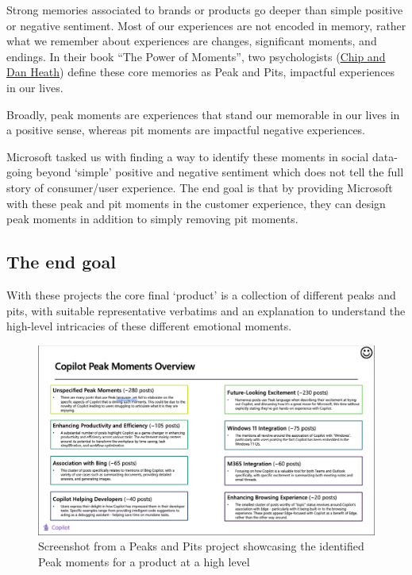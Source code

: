\documentclass[
  letterpaper,
  DIV=11,
  numbers=noendperiod]{scrreprt}
\begin{document}
Strong memories associated to brands or products go deeper than simple
positive or negative sentiment. Most of our experiences are not encoded
in memory, rather what we remember about experiences are changes,
significant moments, and endings. In their book ``The Power of
Moments'', two psychologists
(\href{https://heathbrothers.com/about/}{Chip and Dan Heath}) define
these core memories as Peak and Pits, impactful experiences in our
lives.

Broadly, peak moments are experiences that stand our memorable in our
lives in a positive sense, whereas pit moments are impactful negative
experiences.

Microsoft tasked us with finding a way to identify these moments in
social data- going beyond `simple' positive and negative sentiment which
does not tell the full story of consumer/user experience. The end goal
is that by providing Microsoft with these peak and pit moments in the
customer experience, they can design peak moments in addition to simply
removing pit moments.

\subsection{The end goal}\label{the-end-goal}

With these projects the core final `product' is a collection of
different peaks and pits, with suitable representative verbatims and an
explanation to understand the high-level intricacies of these different
emotional moments.

\begin{figure}[H]

{\centering \includegraphics{img/peaks_list.png}

}

\caption{Screenshot from a Peaks and Pits project showcasing the
identified Peak moments for a product at a high level}

\end{figure}%
\end{document}
